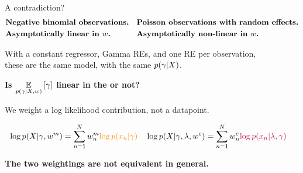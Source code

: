\begin{frame}[t]{A contradiction?}
    \vspace{-1em}
    \begin{align*}
    &\text{\textbf{Negative binomial observations.}}
    &
    &\text{\textbf{Poisson observations with random effects.}}
    \\
    &\text{\textbf{Asymptotically linear in $w$.}}
    &
    &\text{\textbf{Asymptotically non-linear in $w$.}}
    \end{align*}
    \begin{center}
    With a constant regressor, Gamma REs, and one RE per observation,\\
    these are the same model, with the same $p(\gamma \vert X)$.
    
    \textbf{Is $\underset{p(\gamma \vert X, w)}{\mathbb{E}}\left[\gamma\right]$
    linear in the 
    or not?}
    
    \spskip

    \textbf{}  We weight a log likelihood
    contribution, not a datapoint.

    \begin{align*}
        &\log p(X \vert \gamma, w^{m}) =
            \sum_{n=1}^N w^{m}_n 
            \textcolor{orange}{\log p(x_n \vert \gamma)}
        &
        &\log p(X \vert \gamma, \lambda, w^{c}) =
            \sum_{n=1}^N w^{c}_n 
            \textcolor{purple}{\log p(x_n \vert \lambda, \gamma)}
    \end{align*}
        

    \textbf{The two weightings are not equivalent in general.}

    
    \end{center}
\end{frame}


